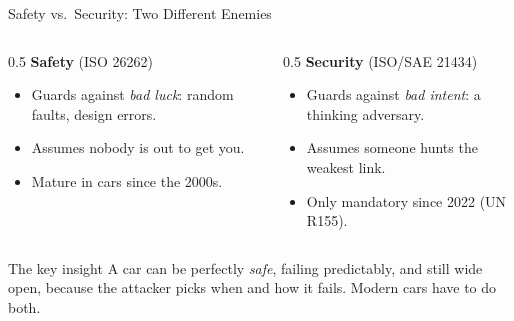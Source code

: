 
\begin{frame}{Safety vs.\ Security: Two Different Enemies}
  \begin{columns}[T]
    \begin{column}{0.5\textwidth}
      \textbf{Safety} \;(ISO 26262)
      \begin{itemize}
        \item Guards against \emph{bad luck}: random faults, design errors.
        \item Assumes nobody is out to get you.
        \item Mature in cars since the 2000s.
      \end{itemize}
    \end{column}
    \begin{column}{0.5\textwidth}
      \textbf{Security} \;(ISO/SAE 21434)
      \begin{itemize}
        \item Guards against \emph{bad intent}: a thinking adversary.
        \item Assumes someone hunts the weakest link.
        \item Only mandatory since 2022 (UN R155).
      \end{itemize}
    \end{column}
  \end{columns}
  \vspace{0.3cm}
  \begin{alertblock}{The key insight}
    A car can be perfectly \emph{safe}, failing predictably, and still wide open, because the attacker picks when and how it fails. Modern cars have to do both.
  \end{alertblock}
\end{frame}
